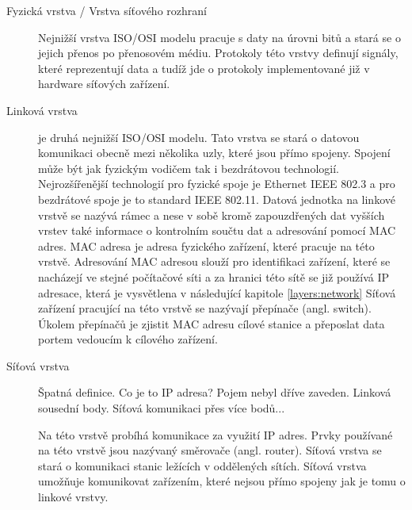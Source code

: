 \begin{description}
\item[Fyzická vrstva / Vrstva síťového rozhraní]\label{layers:physical} %
Nejnižší vrstva ISO/OSI modelu pracuje s daty na úrovni bitů a stará se o
jejich přenos po přenosovém médiu. Protokoly této vrstvy definují signály, které reprezentují data
a tudíž jde o protokoly implementované již v hardware síťových zařízení.

\item[Linková vrstva]\label{layers:link} %
je druhá nejnižší ISO/OSI modelu. Tato vrstva se stará o datovou komunikaci
obecně mezi několika uzly, které jsou přímo spojeny. Spojení může být jak fyzickým vodičem tak i
bezdrátovou technologií. Nejrozšířenější technologií pro fyzické spoje je Ethernet IEEE 802.3 a pro bezdrátové spoje
je to standard IEEE 802.11. Datová jednotka na linkové vrstvě se nazývá rámec a nese v sobě kromě
zapouzdřených dat vyšších vrstev také informace o kontrolním součtu dat a adresování pomocí MAC adres.
MAC adresa je adresa fyzického zařízení, které pracuje na této vrstvě.
Adresování MAC adresou slouží pro identifikaci zařízení, které se nacházejí ve stejné počítačové síti
a za hranici této sítě se již používá IP adresace, která je vysvětlena v následující kapitole \ref{layers:network}
Síťová zařízení pracující na této vrstvě se nazývají přepínače (angl. switch). Úkolem přepínačů je zjistit MAC adresu cílové stanice a přeposlat data portem vedoucím k cílového zařízení.

\item[Síťová vrstva]\label{layers:network} %
Špatná definice. Co je to IP adresa? Pojem nebyl dříve zaveden.
Linková sousední body. Síťová komunikaci přes více bodů...


Na této vrstvě probíhá komunikace za využití IP adres. Prvky používané na této vrstvě jsou nazývaný směrovače
(angl. router). Síťová vrstva se stará o komunikaci stanic ležících v oddělených sítích.
Síťová vrstva umožňuje komunikovat zařízením, které nejsou přímo spojeny jak je tomu o linkové vrstvy.


\end{description}
